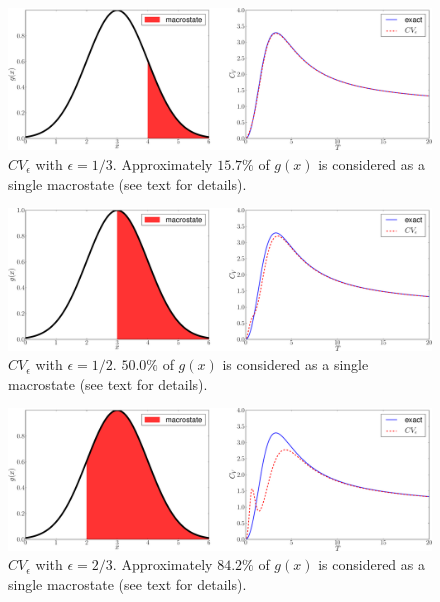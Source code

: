 %
\begin{figure}[ht]
  \includegraphics[width=\textwidth]{supplement/macrostate_approx_example/pictures/macrostate_epsilon_153664915749_4.pdf}
  \caption{$CV_{\epsilon}$ with $\epsilon = 1/3$. Approximately $15.7\%$ of $g(x)$ is considered as a single macrostate (see text for details). }
  \label{fig:macrostate_ex_cut_4}
\end{figure}
%
\begin{figure}[ht]
  \includegraphics[width=\textwidth]{supplement/macrostate_approx_example/pictures/macrostate_epsilon_488131536823_3.pdf}
  \caption{$CV_{\epsilon}$ with $\epsilon = 1/2$. $50.0\%$ of $g(x)$ is considered as a single macrostate (see text for details). }
  \label{fig:macrostate_ex_cut_3}
\end{figure}
%
\begin{figure}[ht]
  \includegraphics[width=\textwidth]{supplement/macrostate_approx_example/pictures/macrostate_epsilon_829972199084_2.pdf}
  \caption{$CV_{\epsilon}$ with $\epsilon = 2/3$. Approximately $84.2\%$ of $g(x)$ is considered as a single macrostate (see text for details). }
  \label{fig:macrostate_ex_cut_2}
\end{figure}
